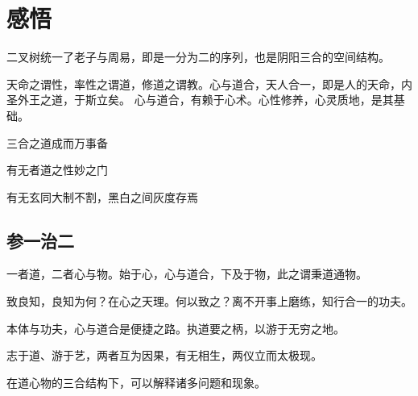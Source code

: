 \section{感悟}

二叉树统一了老子与周易，即是一分为二的序列，也是阴阳三合的空间结构。

天命之谓性，率性之谓道，修道之谓教。心与道合，天人合一，即是人的天命，内圣外王之道，于斯立矣。
心与道合，有赖于心术。心性修养，心灵质地，是其基础。

三合之道成而万事备

有无者道之性妙之门

有无玄同大制不割，黑白之间灰度存焉

\subsection{参一治二}

一者道，二者心与物。始于心，心与道合，下及于物，此之谓秉道通物。

致良知，良知为何？在心之天理。何以致之？离不开事上磨练，知行合一的功夫。

本体与功夫，心与道合是便捷之路。执道要之柄，以游于无穷之地。

志于道、游于艺，两者互为因果，有无相生，两仪立而太极现。

在道心物的三合结构下，可以解释诸多问题和现象。
